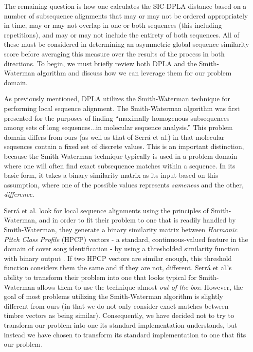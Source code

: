 \documentclass[a4paper,12pt]{report} 	%
\numberwithin{figure}{chapter}
\numberwithin{table}{chapter}
\numberwithin{equation}{chapter}
\begin{document}
\begin{flushleft}
The remaining question is how one calculates the SIC-DPLA distance based on a number of subsequence alignments that may or may not be ordered appropriately in time, may or may not overlap in one or both sequences (this including repetitions), and may or may not include the entirety of both sequences. All of these must be considered in determining an asymmetric global sequence similarity score before averaging this measure over the results of the process in both directions. To begin, we must briefly review both DPLA and the Smith-Waterman algorithm and discuss how we can leverage them for our problem domain.

As previously mentioned, DPLA utilizes the Smith-Waterman technique for performing local sequence alignment. The Smith-Waterman algorithm was first presented for the purposes of  finding ``maximally homogenous subsequences among sets of long sequences...in molecular sequence analysis.'' This problem domain differs from ours (as well as that of Serr\'a et al.) in that molecular sequences contain a fixed set of discrete values. This is an important distinction, because the Smith-Waterman technique typically is used in a problem domain where one will often find exact subsequence matches within a sequence. In its basic form, it takes a binary similarity matrix as its input based on this assumption, where one of the possible values represents \emph{sameness} and the other, \emph{difference}.

Serr\'a et al. look for local sequence alignments using the principles of Smith-Waterman, and in order to fit their problem to one that is readily handled by Smith-Waterman, they generate a binary similarity matrix between \emph{Harmonic Pitch Class Profile} (HPCP) vectors - a standard, continuous-valued feature in the domain of cover song identification - by using a thresholded similarity function with binary output \cite{serra2008chroma}. If two HPCP vectors are similar enough, this threshold function considers them the same and if they are not, different. Serr\'a et al.'s ability to transform their problem into one that looks typical for Smith-Waterman allows them to use the technique almost \emph{out of the box}.  However, the goal of most problems utilizing the Smith-Waterman algorithm is slightly different from ours (in that we do not only consider exact matches between timbre vectors as being similar). Consequently, we have decided not to try to transform our problem into one its standard implementation understands, but instead we have chosen to transform its standard implementation to one that fits our problem.


\end{flushleft}
\end{document}
